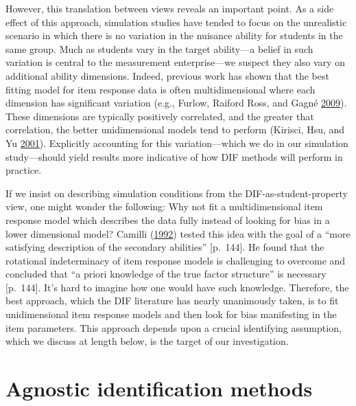 \documentclass[
  11pt,
]{article}
\begin{document}
However, this translation between views reveals an important point. As a side effect of this approach, simulation studies have tended to focus on the unrealistic scenario in which there is no variation in the nuisance ability for students in the same group. Much as students vary in the target ability---a belief in such variation is central to the measurement enterprise---we suspect they also vary on additional ability dimensions. Indeed, previous work has shown that the best fitting model for item response data is often multidimensional where each dimension has significant variation (e.g., Furlow, Raiford Ross, and Gagné \protect\hyperlink{ref-furlow2009impact}{2009}). These dimensions are typically positively correlated, and the greater that correlation, the better unidimensional models tend to perform (Kirisci, Hsu, and Yu \protect\hyperlink{ref-kirisci2001robustness}{2001}). Explicitly accounting for this variation---which we do in our simulation study---should yield results more indicative of how DIF methods will perform in practice.

If we insist on describing simulation conditions from the DIF-as-student-property view, one might wonder the following: Why not fit a multidimensional item response model which describes the data fully instead of looking for bias in a lower dimensional model? Camilli (\protect\hyperlink{ref-camilli1992conceptual}{1992}) tested this idea with the goal of a \enquote{more satisfying description of the secondary abilities} {[}p.~144{]}. He found that the rotational indeterminacy of item response models is challenging to overcome and concluded that \enquote{a priori knowledge of the true factor structure} is necessary {[}p.~144{]}. It's hard to imagine how one would have such knowledge. Therefore, the best approach, which the DIF literature has nearly unanimously taken, is to fit unidimensional item response models and then look for bias manifesting in the item parameters. This approach depends upon a crucial identifying assumption, which we discuss at length below, is the target of our investigation.

\hypertarget{agnostic-identification-methods}{%
\section{Agnostic identification methods}\label{agnostic-identification-methods}}
\end{document}
